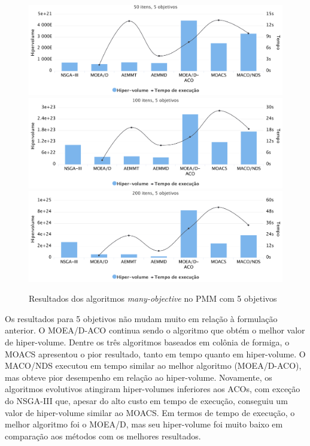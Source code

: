 \begin{figure}[!htbp]
	\includegraphics[width=1\textwidth]{cap_experimentos/figs/etapa4/i50o5}
	\includegraphics[width=1\textwidth]{cap_experimentos/figs/etapa4/i100o5}
	\includegraphics[width=1\textwidth]{cap_experimentos/figs/etapa4/i200o5}
	\caption{\label{fig_exp4_mkp_o5}Resultados dos algoritmos \textit{many-objective} no PMM com 5 objetivos}
\end{figure}

Os resultados para 5 objetivos não mudam muito em relação à formulação anterior. O MOEA/D-ACO continua sendo o algoritmo que obtém o melhor valor de hiper-volume. Dentre os três algoritmos baseados em colônia de formiga, o MOACS apresentou o pior resultado, tanto em tempo quanto em hiper-volume. O MACO/NDS executou em tempo similar ao melhor algoritmo (MOEA/D-ACO), mas obteve pior desempenho em relação ao hiper-volume. Novamente, os algoritmos evolutivos atingiram hiper-volumes inferiores aos ACOs, com exceção do NSGA-III que, apesar do alto custo em tempo de execução, conseguiu um valor de hiper-volume similar ao MOACS. Em termos de tempo de execução, o melhor algoritmo foi o MOEA/D, mas seu hiper-volume foi muito baixo em comparação aos métodos com os melhores resultados.

